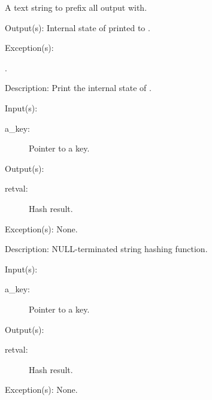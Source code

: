 \begin{capi}
\begin{capilist}
\begin{description}
			A text string to prefix all output with.
		\end{description}
	\item[Output(s): ]
		Internal state of  printed to .
	\item[Exception(s): ]
		\begin{description}\item[]
		\item[.]
		\end{description}
	\item[Description: ]
		Print the internal state of .
	\end{capilist}
\label{ch_string_hash}
	\begin{capilist}
	\item[Input(s): ]
		\begin{description}\item[]
		\item[a\_key: ]
			Pointer to a key.
		\end{description}
	\item[Output(s): ]
		\begin{description}\item[]
		\item[retval: ]
			Hash result.
		\end{description}
	\item[Exception(s): ] None.
	\item[Description: ]
		NULL-terminated string hashing function.
	\end{capilist}
\label{ch_direct_hash}
	\begin{capilist}
	\item[Input(s): ]
		\begin{description}\item[]
		\item[a\_key: ]
			Pointer to a key.
		\end{description}
	\item[Output(s): ]
		\begin{description}\item[]
		\item[retval: ]
			Hash result.
		\end{description}
	\item[Exception(s): ] None.

\end{capilist}
\end{capi}
